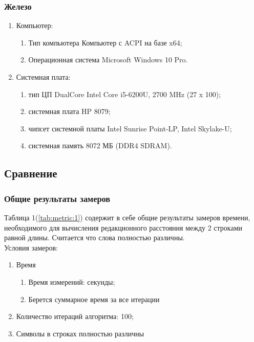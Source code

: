 \documentclass[a4paper, 14pt]{article}
\begin{document}
	\subsubsection{Железо}
	
	\begin{enumerate}
		\item Компьютер:
		\begin{enumerate}
			\item Тип компьютера   Компьютер с ACPI на базе x64;
			\item Операционная система   Microsoft Windows 10 Pro.
		\end{enumerate}
		\item Системная плата:
		\begin{enumerate}
			\item тип ЦП   DualCore Intel Core i5-6200U, 2700 MHz (27 x 100);
			\item системная плата   HP 8079;
			\item чипсет системной платы   Intel Sunrise Point-LP, Intel Skylake-U;
			\item системная память   8072 МБ (DDR4 SDRAM).
		\end{enumerate}
	\end{enumerate}
	
	\subsection{Сравнение}
	
	\subsubsection{Общие результаты замеров}
	
	Таблица 1(\ref{tab:metric:1}) содержит в себе общие результаты замеров времени, необходимого для вычисления редакционного расстояния между 2 строками равной длины. Считается что слова полностью различны. \\
	
	Условия замеров:
	\begin{enumerate}
		\item Время
		\begin{enumerate}
			\item Время измерений: секунды;
			\item Берется суммарное время за все итерации
		\end{enumerate}
		\item Количество итераций алгоритма: 100;
		\item Символы в строках полностью различны
	\end{enumerate}
	
\end{document}
